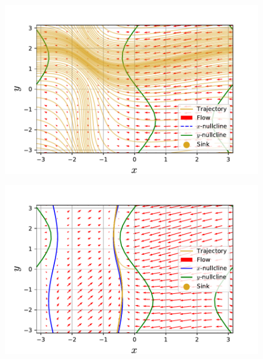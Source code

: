 \documentclass[../main]{subfiles}
\begin{document}
\begin{figure}[tbp]
\begin{minipage}[b]{0.47\linewidth}
      \centering
      \includegraphics[keepaspectratio, scale=0.42]{images/phase_a4K22.pdf}
      \label{fig:phase-k22}
    \end{minipage}
    \begin{minipage}[b]{0.47\linewidth}
      \centering
      \includegraphics[keepaspectratio, scale=0.42]{images/phase_a4K50.pdf}
      \label{fig:phase-k50}
    \end{minipage}\\
    \begin{minipage}[b]{0.47\linewidth}
      \centering

\end{minipage}
\end{figure}
\end{document}
